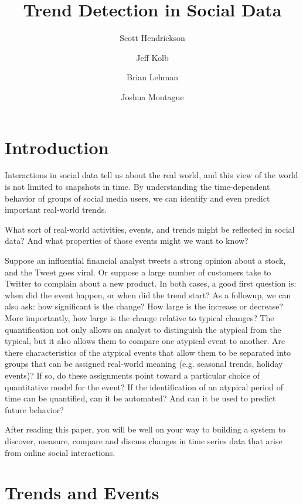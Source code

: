 \documentclass{article}
\title{Trend Detection in Social Data}
\author[]{Scott Hendrickson}
\author[]{Jeff Kolb}
\author[]{Brian Lehman}
\author[]{Joshua Montague}
\affil[]{ \Large{Twitter, Inc.} }
\begin{document}
\maketitle

\frenchspacing

\section{Introduction}
\label{intro}

Interactions in social data tell us about the real world, and this view of the world 
is not limited to snapshots in time. 
By understanding the time-dependent behavior of groups of social media users, we
can identify and even predict important real-world trends. 

What sort of real-world activities, events, and trends might be reflected in
social data? And what properties of those events might we want to know?

Suppose an influential financial analyst tweets a strong opinion about a stock,
and the Tweet goes viral. Or suppose a large number of customers take to
Twitter to complain about a new product. In both cases, a good first question
is: when did the event happen, or when did the trend start? As a followup, we
can also ask: how significant is the change? How large is the increase or
decrease? More importantly, how large is the change relative to typical
changes? The quantification not only allows an analyst to distinguish the
atypical from the typical, but it also allows them to compare one atypical
event to another. Are there characteristics of the atypical events that allow
them to be separated into groups that can be assigned real-world meaning (e.g.
seasonal trends, holiday events)? If so, do these assignments point toward a
particular choice of quantitative model for the event? 
If the identification of an atypical period of time
can be quantified, can it be automated? And can it be used to predict future
behavior?

After reading this paper, you will be well on your way to building a system to
discover, measure, compare and discuss changes in time series data that arise
from online social interactions.

\section{Trends and Events}  \label{definitions}
\end{document}
